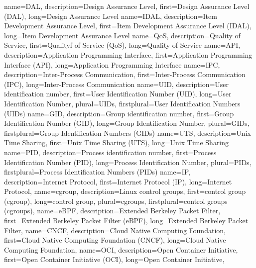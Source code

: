 {%
    name={DAL},
    description={Design Assurance Level},
    first={Design Assurance Level (DAL)},
    long={Design Assurance Level}
}
{%
    name={IDAL},
    description={Item Development Assurance Level},
    first={Item Development Assurance Level (IDAL)},
    long={Item Development Assurance Level}
}
{%
    name={QoS},
    description={Quality of Service},
    first={Qualityf of Service (QoS)},
    long={Quality of Service}
}
{%
    name={API},
    description={Application Programming Interface},
    first={Application Programming Interface (API)},
    long={Application Programming Interface}
}
{%
    name={IPC},
    description={Inter-Process Communication},
    first={Inter-Process Communication (IPC)},
    long={Inter-Process Communication}
}
{%
    name={UID},
    description={User identification number},
    first={User Identification Number (UID)},
    long={User Identification Number},
    plural={UIDs},
    firstplural={User Identification Numbers (UIDs)}
}
{%
    name={GID},
    description={Group identification number},
    first={Group Identification Number (GID)},
    long={Group Identification Number},
    plural={GIDs},
    firstplural={Group Identification Numbers (GIDs)}
}
{%
    name={UTS},
    description={Unix Time Sharing},
    first={Unix Time Sharing (UTS)},
    long={Unix Time Sharing}
}
{%
    name={PID},
    description={Process identification number},
    first={Process Identification Number (PID)},
    long={Process Identification Number},
    plural={PIDs},
    firstplural={Process Identification Numbers (PIDs)}
}
{%
    name={IP},
    description={Internet Protocol},
    first={Internet Protocol (IP)},
    long={Internet Protocol},
}
{%
    name={cgroup},
    description={Linux control groups},
    first={control group (cgroup)},
    long={control group},
    plural={cgroups},
    firstplural={control groups (cgroups)},
}
{%
    name={eBPF},
    description={Extended Berkeley Packet Filter},
    first={Extended Berkeley Packet Filter (eBPF)},
    long={Extended Berkeley Packet Filter},
}
{%
    name={CNCF},
    description={Cloud Native Computing Foundation},
    first={Cloud Native Computing Foundation (CNCF)},
    long={Cloud Native Computing Foundation},
}
{%
    name={OCI},
    description={Open Container Initiative},
    first={Open Container Initiative (OCI)},
    long={Open Container Initiative},
}






